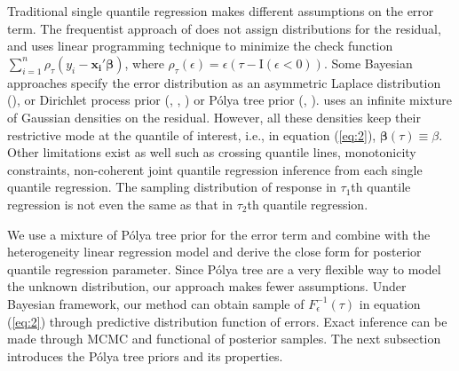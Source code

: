 \documentclass[12pt]{article}
\newcommand{\polya}{P\'{o}lya}
\begin{document}
Traditional single quantile regression makes different assumptions on
the error term. The frequentist approach of \citet{koenker1978} does not 
assign distributions for the residual, and uses linear
programming technique to minimize the check function $\sum_{i=1}^n
\rho_{\tau}(y_i - \bm{x_i'\beta})$, where $\rho_{\tau}(\epsilon) =
\epsilon (\tau- \mathrm{I}(\epsilon < 0))$. 
Some Bayesian 
approaches specify the error distribution as an asymmetric Laplace
distribution (\citet{yu2001}), or Dirichlet process prior
(\citet{kottas2001}, \citet{kottas2009},  \citet{taddy2010}) or
\polya{} tree prior (\citet{walker1999}, \citet{hanson2002}). \citet{reich2010}
uses an infinite mixture of Gaussian densities on the 
residual. However, all these densities keep their
restrictive mode at the quantile of interest, i.e., in equation
(\ref{eq:2}), $\bm{\beta}(\tau) \equiv \beta$. Other limitations exist
as well such as crossing quantile lines, monotonicity constraints,
non-coherent joint quantile regression inference from each single
quantile regression. The sampling distribution of response in
$\tau_1$th quantile regression is not even the same as that in
$\tau_2$th quantile regression.

We use a mixture of \polya{} tree prior for the error term and
combine with the heterogeneity linear regression model and derive the
close form for posterior quantile regression parameter. Since \polya{}
tree are a very flexible way to model the unknown distribution, our
approach makes fewer assumptions. Under Bayesian framework, our method
can obtain sample of $F^{-1}_{\epsilon}(\tau)$ in equation
(\ref{eq:2}) through predictive distribution function of errors. Exact
inference can be made through MCMC and functional of posterior
samples. The next subsection introduces the \polya{} tree priors and
its properties.
\end{document}
